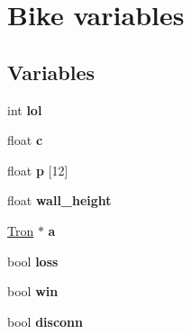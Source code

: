 \hypertarget{group___b_i_k_e___v_a_r_i_a_b_l_e_s}{\section{Bike variables}
\label{group___b_i_k_e___v_a_r_i_a_b_l_e_s}
}
\subsection*{Variables}
\begin{DoxyCompactItemize}
\item 
\hypertarget{group___b_i_k_e___v_a_r_i_a_b_l_e_s_ga651a8d2037959ad90def68edb2eebc16}{int {\bfseries lol}}\label{group___b_i_k_e___v_a_r_i_a_b_l_e_s_ga651a8d2037959ad90def68edb2eebc16}

\item 
\hypertarget{group___b_i_k_e___v_a_r_i_a_b_l_e_s_gae78103ab33f03590e84ff7bc735629d7}{float {\bfseries c}}\label{group___b_i_k_e___v_a_r_i_a_b_l_e_s_gae78103ab33f03590e84ff7bc735629d7}

\item 
\hypertarget{group___b_i_k_e___v_a_r_i_a_b_l_e_s_gacd855b065b4ba636510c7cf34beefd81}{float {\bfseries p} \mbox{[}12\mbox{]}}\label{group___b_i_k_e___v_a_r_i_a_b_l_e_s_gacd855b065b4ba636510c7cf34beefd81}

\item 
\hypertarget{group___b_i_k_e___v_a_r_i_a_b_l_e_s_ga73d554625748f9c299a212eb16e7033d}{float {\bfseries wall\-\_\-height}}\label{group___b_i_k_e___v_a_r_i_a_b_l_e_s_ga73d554625748f9c299a212eb16e7033d}

\item 
\hypertarget{group___b_i_k_e___v_a_r_i_a_b_l_e_s_ga6b38ebd1a761dd57db63c374202260e7}{\hyperlink{class_tron}{Tron} $\ast$ {\bfseries a}}\label{group___b_i_k_e___v_a_r_i_a_b_l_e_s_ga6b38ebd1a761dd57db63c374202260e7}

\item 
\hypertarget{group___b_i_k_e___v_a_r_i_a_b_l_e_s_ga69f4540578b994f09db29c90d03bf3e2}{bool {\bfseries loss}}\label{group___b_i_k_e___v_a_r_i_a_b_l_e_s_ga69f4540578b994f09db29c90d03bf3e2}

\item 
\hypertarget{group___b_i_k_e___v_a_r_i_a_b_l_e_s_ga568f8fc25455991c59ab8f2ca95e7017}{bool {\bfseries win}}\label{group___b_i_k_e___v_a_r_i_a_b_l_e_s_ga568f8fc25455991c59ab8f2ca95e7017}

\item 
\hypertarget{group___b_i_k_e___v_a_r_i_a_b_l_e_s_gae43ba6c13b4f7a00a863b9764d0ff859}{bool {\bfseries disconn}}\label{group___b_i_k_e___v_a_r_i_a_b_l_e_s_gae43ba6c13b4f7a00a863b9764d0ff859}


\end{DoxyCompactItemize}
